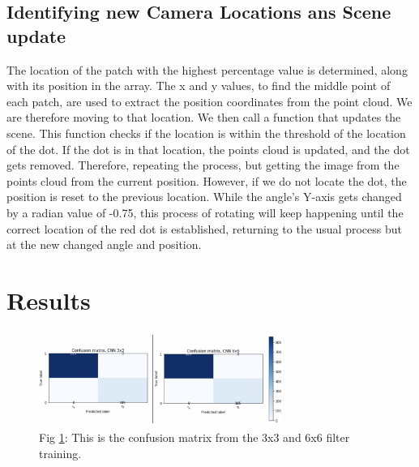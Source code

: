 \documentclass[a4paper,10pt]{article}
\begin{document}
\subsection{Identifying new Camera Locations ans Scene update}
The location of the patch with the highest percentage value is determined, along with its position in the array. The x and y values, to find the middle point of each patch, are used to extract the position coordinates from the point cloud. We are therefore moving to that location. We then call a function that updates the scene. This function checks if the location is within the threshold of the location of the dot. If the dot is in that location, the points cloud is updated, and the dot gets removed. Therefore, repeating the process, but getting the image from the points cloud from the current position. However, if we do not locate the dot, the position is reset to the previous location. While the angle's Y-axis gets changed by a radian value of -0.75, this process of rotating will keep happening until the correct location of the red dot is established, returning to the usual process but at the new changed angle and position.







\section{Results}

\begin{figure}[t]
	\label{confusion_matrix}
	\includegraphics[width=8cm]{confusion_matrix.png}
	\\Fig \ref{confusion_matrix}: This is the confusion matrix from the 3x3 and 6x6 filter training.
	\centering
\end{figure}
\end{document}
